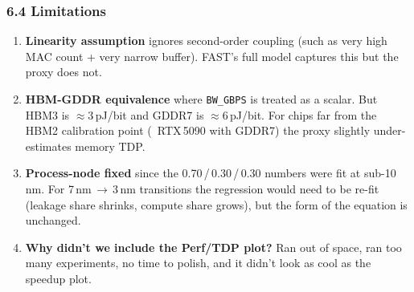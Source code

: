 \documentclass[11pt,a4paper]{article}
\newcommand{\ic}[1]{\texttt{#1}}
\begin{document}
\subsubsection*{6.4 Limitations}

\begin{enumerate}
  \item \textbf{Linearity assumption} ignores second-order coupling
        (such as very high MAC count + very narrow buffer). FAST's full model captures this but the proxy does not.

  \item \textbf{HBM-GDDR equivalence} where \ic{BW\_GBPS} is treated as a
        scalar. But HBM3 is $\approx 3$\,pJ/bit and GDDR7 is
        $\approx 6$\,pJ/bit. For chips far from the HBM2 calibration point
        (\ RTX\,5090 with GDDR7) the proxy slightly under-estimates memory
        TDP. 

  \item \textbf{Process-node fixed} since the 0.70\,/\,0.30\,/\,0.30 numbers
        were fit at sub-10\,nm. For 7\,nm\,$\to$\,3\,nm transitions the
        regression would need to be re-fit (leakage share shrinks, compute share grows), but the form of the equation is unchanged.
        
  \item \textbf{Why didn't we include the Perf/TDP plot?} Ran out of space, ran too many experiments, no time to polish, and it didn't look as cool as the speedup plot.
\end{enumerate}
\end{document}
